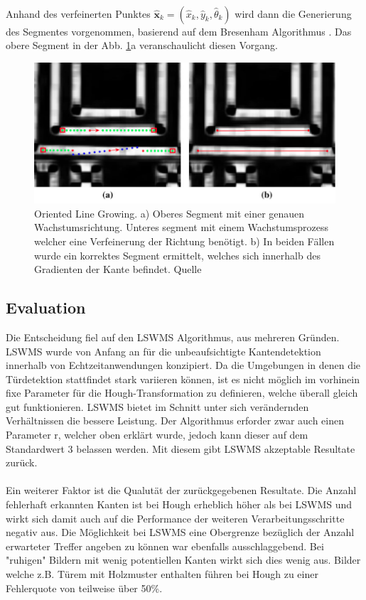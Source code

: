 \paragraph{}
Anhand des verfeinerten Punktes $\hat{\textbf{x}}_k = (\hat{x}_k, \hat{y}_k, \hat{\theta}_k)$ wird dann die Generierung des Segmentes vorgenommen, basierend auf dem Bresenham Algorithmus \cite{bresenham}. Das obere Segment in der Abb. \ref{fig:lswms-line-growing}a veranschaulicht diesen Vorgang.

\begin{figure}[!ht]
\centering
\includegraphics[width=\textwidth]{images/lswms-line-growing} 
\caption{Oriented Line Growing. a) Oberes Segment mit einer genauen Wachstumsrichtung. Unteres segment mit einem Wachstumsprozess welcher eine Verfeinerung der Richtung benötigt. b) In beiden Fällen wurde ein korrektes Segment ermittelt, welches sich innerhalb des Gradienten der Kante befindet. Quelle \cite{nieto}}
\label{fig:lswms-line-growing}
\end{figure}

\subsection{Evaluation}

Die Entscheidung fiel auf den LSWMS Algorithmus, aus mehreren Gründen. LSWMS wurde von Anfang an für die unbeaufsichtigte Kantendetektion innerhalb von Echtzeitanwendungen konzipiert. Da die Umgebungen in denen die Türdetektion stattfindet stark variieren können, ist es nicht möglich im vorhinein fixe Parameter für die Hough-Transformation zu definieren, welche überall gleich gut funktionieren. LSWMS bietet im Schnitt unter sich verändernden Verhältnissen die bessere Leistung. Der Algorithmus erforder zwar auch einen Parameter r, welcher oben erklärt wurde, jedoch kann dieser auf dem Standardwert 3 belassen werden. Mit diesem gibt LSWMS akzeptable Resultate zurück.
\paragraph{}
Ein weiterer Faktor ist die Qualutät der zurückgegebenen Resultate. Die Anzahl fehlerhaft erkannten Kanten ist bei Hough erheblich höher als bei LSWMS und wirkt sich damit auch auf die Performance der weiteren Verarbeitungsschritte negativ aus. Die Möglichkeit bei LSWMS eine Obergrenze bezüglich der Anzahl erwarteter Treffer angeben zu können war ebenfalls ausschlaggebend. Bei "ruhigen" Bildern mit wenig potentiellen Kanten wirkt sich dies wenig aus. Bilder welche z.B. Türem mit Holzmuster enthalten führen bei Hough zu einer Fehlerquote von teilweise über 50\%.

